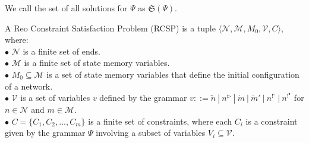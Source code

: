 We call the set of all solutions for $\Psi$ as $\mathfrak{S}(\Psi)$.


\begin{definition}[RCSP] A Reo Constraint Satisfaction Problem (RCSP) is a tuple $\langle \mathcal{N}, \mathcal{M}, M_0, \mathcal{V}, C \rangle$, where:\\
 $\bullet$ $\mathcal{N}$ is a finite set of ends.\\
 $\bullet$ $\mathcal{M}$ is a finite set of state memory variables.\\
 $\bullet$ $M_0 \subseteq \mathcal{M}$ is a set of state memory variables that define the initial configuration of a network.\\
 $\bullet$ $\mathcal{V}$ is a set of variables $v$ defined by the grammar $v ::= \tilde{n}\ |\ n^\triangleright\ |\ \mathring{m}\ |\ \mathring{m}'\ |\ n^{!^\circ}\ |\ n^{!^\bullet}$ for $n \in \mathcal{N}$ and $m \in \mathcal{M}$.\\ %
 $\bullet$ $C=\{C_1, C_2, ..., C_m\}$ is a finite set of constraints, where each $C_i$ is a constraint given by the grammar $\Psi$ involving a subset of variables $V_i \subseteq \mathcal{V}$.
\end{definition} 

